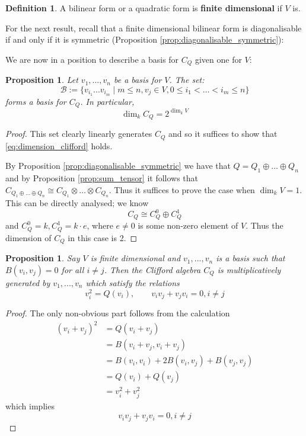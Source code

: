 \documentclass[12pt]{article}
\theoremstyle{plain}
\newtheorem{proposition}[thm]{Proposition}
\theoremstyle{definition}
\newtheorem{defn}[thm]{Definition} %
\newcommand{\scr}[1]{\mathscr{#1}}
\begin{document}
\begin{defn}
A bilinear form or a quadratic form is \textbf{finite dimensional} if $V$ is.
\end{defn}
For the next result, recall that a finite dimensional bilinear form is diagonalisable if and only if it is symmetric (Proposition \ref{prop:diagonalisable_symmetric}):

We are now in a position to describe a basis for $C_Q$ given one for $V$:
\begin{proposition}\label{prop:decomp_even_odd}
Let $v_1,...,v_n$ be a basis for $V$. The set:
\begin{equation}
\scr{B} := \lbrace v_{i_1}...v_{i_m} \mid m \leq n, v_{j} \in V, 0 \leq i_1 < \hdots < i_m \leq n\rbrace
\end{equation}
forms a basis for $C_Q$. In particular,
\begin{equation}\label{eq:dimension_clifford}
\operatorname{dim}_kC_Q = 2^{\operatorname{dim}_kV}
\end{equation}
\end{proposition}
\begin{proof}
This set clearly linearly generates $C_Q$ and so it suffices to show that \eqref{eq:dimension_clifford} holds.

By Proposition \ref{prop:diagonalisable_symmetric} we have that $Q = Q_1 \oplus \hdots \oplus Q_n$ and by Proposition \ref{prop:sum_tensor} it follows that $C_{Q_1 \oplus \hdots \oplus Q_n} \cong C_{Q_1} \otimes \hdots \otimes C_{Q_n}$. Thus it suffices to prove the case when $\operatorname{dim}_kV = 1$. This can be directly analysed; we know
\begin{equation}
C_Q \cong C^0_Q \oplus C^1_Q
\end{equation}
and $C^0_Q = k, C^1_Q = k\cdot e$, where $e \neq 0$ is some non-zero element of $V$. Thus the dimension of $C_Q$ in this case is 2.
\end{proof}
\begin{proposition}
Say $V$ is finite dimensional and $v_1,...,v_n$ is a basis such that $B(v_i,v_j) = 0$ for all $i \neq j$. Then the Clifford algebra $C_Q$ is multiplicatively generated by $v_1,...,v_n$ which satisfy the relations
\begin{equation}\label{eq:clifford_relations}
v_i^2 = Q(v_i),\qquad v_iv_j + v_jv_i = 0, i \neq j
\end{equation}
\end{proposition}
\begin{proof}
The only non-obvious part follows from the calculation
\begin{align*}
(v_i + v_j)^2 &= Q(v_i + v_j)\\
&= B(v_i + v_j, v_i + v_j)\\
&= B(v_i,v_i) + 2B(v_i,v_j) + B(v_j,v_j)\\
&= Q(v_i) + Q(v_j)\\
&= v_i^2 + v_j^2
\end{align*}
which implies
\begin{equation}
v_iv_j + v_jv_i = 0, i \neq j
\end{equation}
\end{proof}
\end{document}
